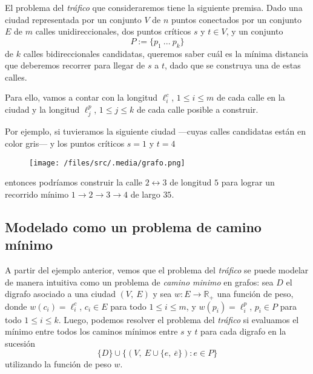 El problema del \textit{tráfico} que consideraremos tiene la siguiente premisa. Dado una ciudad representada por un conjunto $V$ de $n$ puntos conectados por un conjunto $E$ de $m$ calles unidireccionales, dos puntos críticos $s$ y $t \in V$, y un conjunto
\begin{equation*}
    P := \{p_1 \ ... \ p_k\}    
\end{equation*}
de $k$ calles bidireccionales candidatas, queremos saber cuál es la mínima distancia que deberemos recorrer para llegar de $s$ a $t$, dado que se construya una de estas calles.

Para ello, vamos a contar con la longitud $\ell^c_i$, $1 \leq i \leq m$ de cada calle en la ciudad y la longitud $\ell^p_j$, $1 \leq j \leq k$ de cada calle posible a construir.

Por ejemplo, si tuvieramos la siguiente ciudad ---cuyas calles candidatas están en color gris--- y los puntos críticos $s = 1$ y $t = 4$

\begin{figure}[!htbp]
    \texttt{[image: /files/src/.media/grafo.png]} 
\end{figure}
    
\noindent entonces podríamos construir la calle $2 \leftrightarrow 3$ de longitud $5$ para lograr un recorrido mínimo $1 \to 2 \to 3 \to 4$ de largo $35$.

\subsection{Modelado como un problema de camino mínimo}\label{modelo} 

A partir del ejemplo anterior, vemos que el problema del \textit{tráfico} se puede modelar de manera intuitiva como un problema de \textit{camino minimo} en grafos: sea $D$ el digrafo asociado a una ciudad $(V,\ E)$ y sea $w: E \to \mathbb{R}_{+}$ una función de peso, donde $w(c_i) = \ell^c_i$, $c_i \in E$ para todo $1 \leq i \leq m$, y $w(p_i) = \ell^p_i$, $p_i \in P$ para todo $1 \leq i \leq k$. Luego, podemos resolver el problema del \textit{tráfico} si evaluamos el mínimo entre todos los caminos mínimos entre $s$ y $t$ para cada digrafo en la sucesión
\begin{equation}\label{eq_1}
    \{D\} \cup \{(V,\ E \cup \{e,\ \bar{e}\}) : e \in P\}
\end{equation}
utilizando la función de peso $w$.

